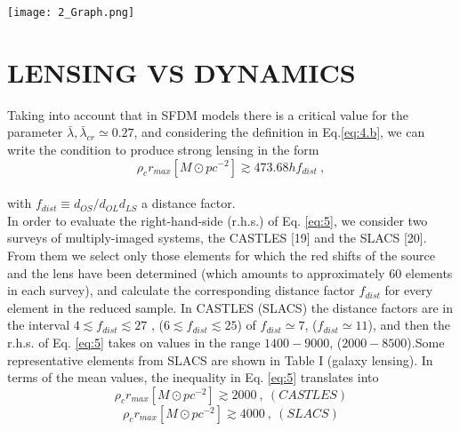 \documentclass[letterpaper,10pt]{article}
\begin{document}
\begin{multicols}{2}
{ \begingroup
 \begin{center}
\texttt{[image: 2\_Graph.png]} 
\end{center}
 \label{FIG.2}
\endgroup

\section{LENSING VS DYNAMICS}
Taking into account that in SFDM models there is a critical value for the parameter $\bar{\lambda}, \bar{\lambda}_{cr} \simeq 0.27$, and considering the definition in Eq.\eqref{eq:4.b}, we can write the condition to produce strong lensing in the form
\begin{equation}
\tag{6}
\label{eq:5}
\rho_{c}r_{max} [M\odot pc^{-2}] \gtrsim 473.68hf_{dist} \: ,
\end{equation}
\\
with $f_{dist} \equiv d_{OS}/d_{OL} d_{LS}$ a distance factor. 
\\
In order to evaluate the right-hand-side (r.h.s.) of Eq. \eqref{eq:5}, we consider two surveys of multiply-imaged systems, the CASTLES [19] and the SLACS [20]. From them we select only those elements for which the red shifts of the source and the lens have been determined (which amounts to approximately 60 elements in each survey), and calculate the corresponding distance factor $f_{dist}$ for every element in the reduced sample. In CASTLES (SLACS) the distance factors are in the interval $4 \lesssim f_{dist} \lesssim 27$ ,  ($6 \lesssim f_{dist} \lesssim 25$) of $f_{dist}\simeq 7$, ($f_{dist} \simeq 11$), and then the r.h.s. of Eq. \eqref{eq:5} takes on values in the range $1400-9000$, ($2000-8500$).Some representative elements from SLACS are shown in Table I (galaxy lensing). In terms of the mean values, the inequality in Eq. \eqref{eq:5} translates into
\begin{equation}
\tag{7a}
\label{eq:6a}
\rho_c r_{max}[M\odot pc^{-2}] \gtrsim 2000 \: ,\:  (CASTLES)
\end{equation}
\begin{equation}
\tag{7b}
\label{eq:6b}
\rho_c r_{max}[M\odot pc^{-2}] \gtrsim 4000 \: , \:  (SLACS)
\end{equation}
\\
}
\end{multicols}
\end{document}
